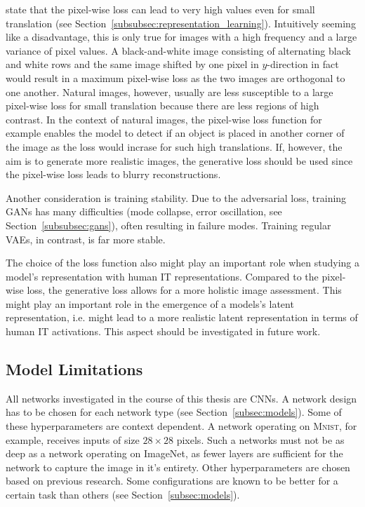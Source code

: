 \citet{larsen2015autoencoding} state that the pixel-wise loss can lead to very high values even for small translation (see Section~\ref{subsubsec:representation_learning}).
Intuitively seeming like a disadvantage, this is only true for images with a high frequency and a large variance of pixel values.
A black-and-white image consisting of alternating black and white rows and the same image shifted by one pixel in $y$-direction in fact would result in a maximum pixel-wise loss as the two images are orthogonal to one another.
Natural images, however, usually are less susceptible to a large pixel-wise loss for small translation because there are less regions of high contrast.
In the context of natural images, the pixel-wise loss function for example enables the model to detect if an object is placed in another corner of the image as the loss would incrase for such high translations.
If, however, the aim is to generate more realistic images, the generative loss should be used since the pixel-wise loss leads to blurry reconstructions.

Another consideration is training stability.
Due to the adversarial loss, training \acp{GAN} has many difficulties (mode collapse, error oscillation, see Section~\ref{subsubsec:gans}), often resulting in failure modes.
Training regular \acp{VAE}, in contrast, is far more stable.

The choice of the loss function also might play an important role when studying a model's representation with human \ac{IT} representations.
Compared to the pixel-wise loss, the generative loss allows for a more holistic image assessment.
This might play an important role in the emergence of a models's latent representation, i.e. might lead to a more realistic latent representation in terms of human IT activations.
This aspect should be investigated in future work.

\subsection{Model Limitations}\label{subsec:model-limitations}
All networks investigated in the course of this thesis are \acp{CNN}.
A network design has to be chosen for each network type (see Section~\ref{subsec:models}).
Some of these hyperparameters are context dependent.
A network operating on \textsc{Mnist}, for example, receives inputs of size $28\times 28$ pixels.
Such a networks must not be as deep as a network operating on ImageNet, as fewer layers are sufficient for the network to capture the image in it's entirety.
Other hyperparameters are chosen based on previous research.
Some configurations are known to be better for a certain task than others (see Section~\ref{subsec:models}).

